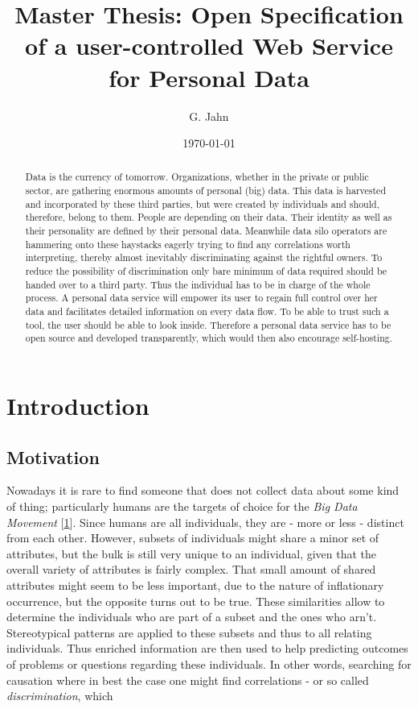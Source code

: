 \documentclass[12pt,english,a4paper,titlepage,cleardoublepage=empty,dottedtoc]{report}
\title{Master Thesis: Open Specification of a user-controlled Web Service for
Personal Data}
\author{G. Jahn}
\date{\today}
\begin{document}
\maketitle
\begin{abstract}
Data is the currency of tomorrow. Organizations, whether in the private
or public sector, are gathering enormous amounts of personal (big) data.
This data is harvested and incorporated by these third parties, but were
created by individuals and should, therefore, belong to them. People are
depending on their data. Their identity as well as their personality are
defined by their personal data. Meanwhile data silo operators are
hammering onto these haystacks eagerly trying to find any correlations
worth interpreting, thereby almost inevitably discriminating against the
rightful owners. To reduce the possibility of discrimination only bare
minimum of data required should be handed over to a third party. Thus
the individual has to be in charge of the whole process. A personal data
service will empower its user to regain full control over her data and
facilitates detailed information on every data flow. To be able to trust
such a tool, the user should be able to look inside. Therefore a
personal data service has to be open source and developed transparently,
which would then also encourage self-hosting.
\end{abstract}

{
\setcounter{tocdepth}{2}
\tableofcontents
}
\chapter{Introduction}\label{introduction}

\section{Motivation}\label{motivation}

Nowadays it is rare to find someone that does not collect data about
some kind of thing; particularly humans are the targets of choice for
the \emph{Big Data Movement}
{[}\protect\hyperlink{ref-web_2016_privacy-international-about-big-data}{1}{]}.
Since humans are all individuals, they are - more or less - distinct
from each other. However, subsets of individuals might share a minor set
of attributes, but the bulk is still very unique to an individual, given
that the overall variety of attributes is fairly complex. That small
amount of shared attributes might seem to be less important, due to the
nature of inflationary occurrence, but the opposite turns out to be
true. These similarities allow to determine the individuals who are part
of a subset and the ones who arn't. Stereotypical patterns are applied
to these subsets and thus to all relating individuals. Thus enriched
information are then used to help predicting outcomes of problems or
questions regarding these individuals. In other words, searching for
causation where in best the case one might find correlations - or so
called \emph{discrimination}, which
\end{document}
